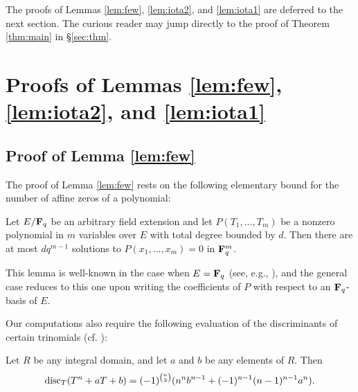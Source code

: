 \documentclass[a4paper]{compositio}
\begin{document}
The proofs of Lemmas \ref{lem:few}, \ref{lem:iota2}, and
\ref{lem:iota1} are deferred to the next section. The curious reader
may jump directly to the proof of Theorem \ref{thm:main} in
\S\ref{sec:thm}.

\section{Proofs of Lemmas \ref{lem:few}, \ref{lem:iota2},
and \ref{lem:iota1}}\label{sec:proofs}
\subsection{Proof of Lemma \ref{lem:few}}
The proof of Lemma \ref{lem:few} rests on the following elementary
bound for the number of affine zeros of a polynomial:

\begin{lem}\label{lem:pbound} Let $E/\mathbf{F}_q$ be an arbitrary field extension
and let $P(T_1,\dots, T_m)$ be a nonzero polynomial in $m$ variables
over $E$ with total degree bounded by $d$. Then there are at most $d
q^{m-1}$ solutions to $P(x_1, \dots, x_m) = 0$ in $\mathbf{F}_q^{m}$.
\end{lem}

This lemma is well-known in the case when $E = \mathbf{F}_q$ (see, e.g.,
\cite[Theorem 6.13]{ln97}), and the general case reduces to this one
upon writing the coefficients of $P$ with respect to an $\mathbf{F}_q$-basis
of $E$.

Our computations also require the following evaluation of the
discriminants of certain trinomials (cf. \cite[Exercise
4.5.4]{esmonde-murty99}):

\begin{lem}\label{lem:discriminants} Let $R$ be any integral domain, and let $a$ and $b$ be
any elements of $R$. Then
\[ \mathrm{disc}_{T}(T^n + aT + b) = (-1)^{\binom{n}{2}} (n^n b^{n-1} + (-1)^{n-1} (n-1)^{n-1} a^n).\]
\end{lem}
\end{document}
